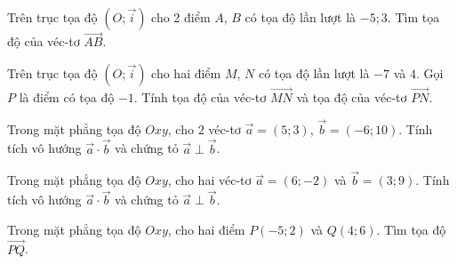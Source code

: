 \begin{bt}%
	Trên trục tọa độ $\left(O;\overrightarrow{i}\right)$ cho 2 điểm $A$, $B$ có tọa độ lần lượt là $-5; 3$. Tìm tọa độ của véc-tơ $\overrightarrow{AB}$.
\end{bt}

\begin{bt}%
Trên trục tọa độ $\left(O;\overrightarrow{i}\right)$ cho hai điểm $M$, $N$ có tọa độ lần lượt là $-7$ và $4$. Gọi $P$ là điểm có tọa độ $-1$. Tính tọa độ của véc-tơ $\overrightarrow{MN}$ và tọa độ của véc-tơ $\overrightarrow{PN}$.
\end{bt}

\begin{bt}%
	Trong mặt phẳng tọa độ $Oxy$, cho $2$ véc-tơ $\overrightarrow{a}=(5;3)$, $\overrightarrow{b}=(-6;10)$. Tính tích vô hướng $\overrightarrow{a}\cdot \overrightarrow{b}$ và chứng tỏ $\overrightarrow{a}\perp\overrightarrow{b}$.
\end{bt}

\begin{bt}%
	Trong mặt phẳng tọa độ $Oxy$, cho hai véc-tơ $\overrightarrow{a}=(6;-2)$ và $\overrightarrow{b}=(3;9)$. Tính tích vô hướng $\overrightarrow{a}\cdot \overrightarrow{b}$ và chứng tỏ $\overrightarrow{a}\perp\overrightarrow{b}$.
\end{bt}

\begin{bt}%
Trong mặt phẳng tọa độ $Oxy$, cho hai điểm $P(-5; 2)$ và $Q(4; 6)$. Tìm tọa độ $\overrightarrow{PQ}$.
\end{bt}

